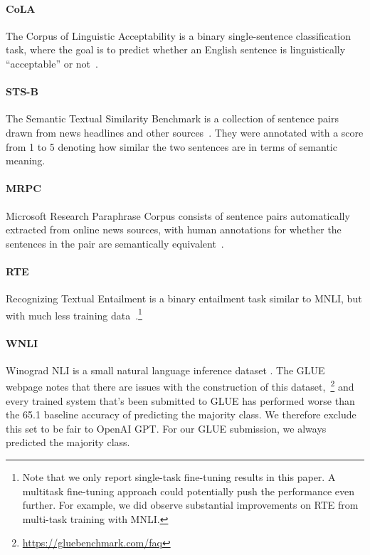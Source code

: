 \documentclass[11pt,a4paper]{article}
\begin{document}
\paragraph{CoLA} The Corpus of Linguistic Acceptability is a binary single-sentence classification task, where the goal is to predict whether an English sentence is linguistically ``acceptable'' or not~\cite{warstadt-singh-bowman:2018:_corpus}.

\paragraph{STS-B} The Semantic Textual Similarity Benchmark is a collection of sentence pairs drawn from news headlines and other sources~\cite{cer-etal:2017}. They were annotated with a score from 1 to 5 denoting how similar the two sentences are in terms of semantic meaning. 

\paragraph{MRPC} Microsoft Research Paraphrase Corpus consists of sentence pairs automatically extracted from online news sources, with human annotations for whether the sentences in the pair are semantically equivalent~\cite{dolan-brockett:2005:_autom}.

\paragraph{RTE} Recognizing Textual Entailment is a binary entailment task similar to MNLI, but with much less training data~\cite{bentivogli-etal:2009}.\footnote{Note that we only report single-task fine-tuning results in this paper. A multitask fine-tuning approach could potentially push
the performance even further. For example, we did observe substantial improvements on RTE from multi-task training with MNLI.}

\paragraph{WNLI} Winograd NLI is a small natural language inference dataset \cite{levesque-davis-morgenstern:2011:_winog}. The GLUE webpage notes that there are issues with the construction of this dataset,~\footnote{\url{https://gluebenchmark.com/faq}} and every trained system that's been submitted to GLUE has performed worse than the 65.1 baseline accuracy of predicting the majority class. We therefore exclude this set to be fair to OpenAI GPT. For our GLUE submission, we always predicted the majority class.
\end{document}
